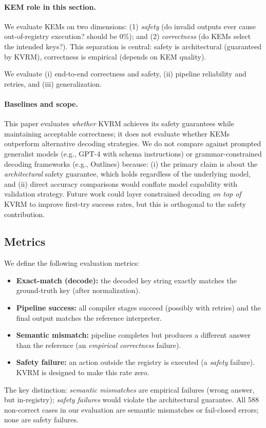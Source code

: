 \documentclass[11pt]{article}
\begin{document}
\paragraph{KEM role in this section.}
We evaluate KEMs on two dimensions: (1) \emph{safety} (do invalid outputs ever cause out-of-registry execution? should be 0\%); and (2) \emph{correctness} (do KEMs select the intended keys?). This separation is central: safety is architectural (guaranteed by KVRM), correctness is empirical (depends on KEM quality).

We evaluate (i) end-to-end correctness and safety, (ii) pipeline reliability and retries, and (iii) generalization.

\paragraph{Baselines and scope.}
This paper evaluates \emph{whether} KVRM achieves its safety guarantees while maintaining acceptable correctness; it does not evaluate whether KEMs outperform alternative decoding strategies.
We do not compare against prompted generalist models (e.g., GPT-4 with schema instructions) or grammar-constrained decoding frameworks (e.g., Outlines) because: (i) the primary claim is about the \emph{architectural} safety guarantee, which holds regardless of the underlying model, and (ii) direct accuracy comparisons would conflate model capability with validation strategy.
Future work could layer constrained decoding \emph{on top of} KVRM to improve first-try success rates, but this is orthogonal to the safety contribution.

\subsection{Metrics}
We define the following evaluation metrics:
\begin{itemize}[leftmargin=*]
  \item \textbf{Exact-match (decode):} the decoded key string exactly matches the ground-truth key (after normalization).
  \item \textbf{Pipeline success:} all compiler stages succeed (possibly with retries) and the final output matches the reference interpreter.
  \item \textbf{Semantic mismatch:} pipeline completes but produces a different answer than the reference (an \emph{empirical correctness} failure).
  \item \textbf{Safety failure:} an action outside the registry is executed (a \emph{safety} failure). KVRM is designed to make this rate zero.
\end{itemize}
The key distinction: \emph{semantic mismatches} are empirical failures (wrong answer, but in-registry); \emph{safety failures} would violate the architectural guarantee. All 588 non-correct cases in our evaluation are semantic mismatches or fail-closed errors; none are safety failures.
\end{document}
